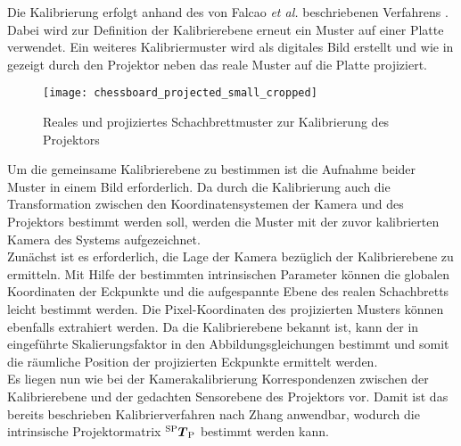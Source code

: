 Die Kalibrierung erfolgt anhand des von Falcao \textit{et al.} beschriebenen Verfahrens \cite{Falcao2008}. Dabei wird zur Definition der Kalibrierebene erneut ein Muster auf einer Platte verwendet. Ein weiteres Kalibriermuster wird als digitales Bild erstellt und wie in  gezeigt durch den Projektor neben das reale Muster auf die Platte projiziert.

\begin{figure}[ht]
	\begin{center}
		\texttt{[image: chessboard\_projected\_small\_cropped]}
		\caption{Reales und projiziertes Schachbrettmuster zur Kalibrierung des Projektors}
		\label{fig.projcalib}
	\end{center}
\end{figure}

\prever{
}

Um die gemeinsame Kalibrierebene zu bestimmen ist die Aufnahme beider Muster in einem Bild erforderlich. Da durch die Kalibrierung auch die Transformation zwischen den Koordinatensystemen der Kamera und des Projektors bestimmt werden soll, werden die Muster mit der zuvor kalibrierten Kamera des Systems aufgezeichnet.\\

Zunächst ist es erforderlich, die Lage der Kamera bezüglich der Kalibrierebene zu ermitteln. Mit Hilfe der bestimmten intrinsischen Parameter können die globalen Koordinaten der Eckpunkte und die aufgespannte Ebene des realen Schachbretts leicht bestimmt werden. Die Pixel-Koordinaten des projizierten Musters können ebenfalls extrahiert werden. Da die Kalibrierebene bekannt ist, kann der in  eingeführte Skalierungsfaktor in den Abbildungsgleichungen bestimmt und somit die räumliche Position der projizierten Eckpunkte ermittelt werden.\\

Es liegen nun wie bei der Kamerakalibrierung Korrespondenzen zwischen der Kalibrierebene und der gedachten Sensorebene des Projektors vor. Damit ist das bereits beschrieben Kalibrierverfahren nach Zhang anwendbar, wodurch die intrinsische Projektormatrix ${^{\mathrm{SP}}\mbox{\boldmath{$T$}}_{\mathrm{P}}}$ bestimmt werden kann.\\



